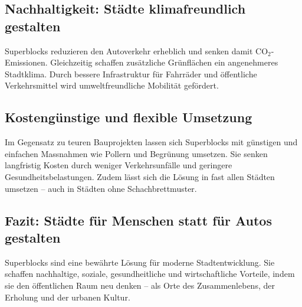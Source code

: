 \begin{tcolorbox}[title=Pro-Argumente,
			parbox=false,
			colback=ForestGreen!10,
			colframe=ForestGreen,
			colbacktitle=ForestGreen]
\subsection*{Nachhaltigkeit: Städte klimafreundlich gestalten}
Superblocks reduzieren den Autoverkehr erheblich und senken damit CO$_2$-Emissionen. Gleichzeitig schaffen zusätzliche Grünflächen ein angenehmeres Stadtklima. Durch bessere Infrastruktur für Fahrräder und öffentliche Verkehrsmittel wird umweltfreundliche Mobilität gefördert.

\subsection*{Kostengünstige und flexible Umsetzung}
Im Gegensatz zu teuren Bauprojekten lassen sich Superblocks mit günstigen und einfachen Massnahmen wie Pollern und Begrünung umsetzen. Sie senken langfristig Kosten durch weniger Verkehrsunfälle und geringere Gesundheitsbelastungen. Zudem lässt sich die Lösung in fast allen Städten umsetzen -- auch in Städten ohne Schachbrettmuster.

\subsection*{Fazit: Städte für Menschen statt für Autos gestalten}
Superblocks sind eine bewährte Lösung für moderne Stadtentwicklung. Sie schaffen nachhaltige, soziale, gesundheitliche und wirtschaftliche Vorteile, indem sie den öffentlichen Raum neu denken – als Orte des Zusammenlebens, der Erholung und der urbanen Kultur.

\end{tcolorbox}
\newpage


